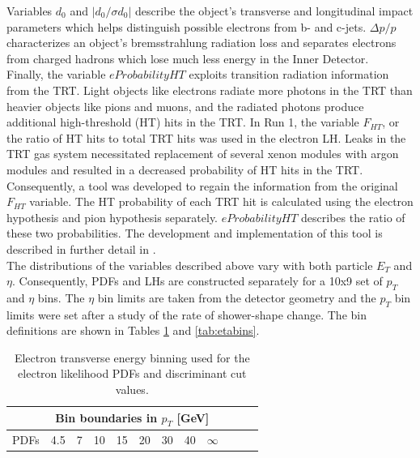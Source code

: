 Variables $d_0$ and $|d_0/\sigma d_0|$ describe the object's transverse and longitudinal impact parameters which helps distinguish possible electrons from b- and c-jets. $\Delta p /p$ characterizes an object's bremsstrahlung radiation loss and separates electrons from charged hadrons which lose much less energy in the Inner Detector. \\

Finally, the variable $eProbabilityHT$ exploits transition radiation information from the TRT. Light objects like electrons radiate more photons in the TRT than heavier objects like pions and muons, and the radiated photons produce additional high-threshold (HT) hits in the TRT. In Run 1, the variable $F_{HT}$, or the ratio of HT hits to total TRT hits was used in the electron LH. Leaks in the TRT gas system necessitated replacement of several xenon modules with argon modules and resulted in a decreased probability of HT hits in the TRT. Consequently, a tool was developed to regain the information from the original $F_{HT}$ variable. The HT probability of each TRT hit is calculated using the electron hypothesis and pion hypothesis separately. $eProbabilityHT$ describes the ratio of these two probabilities. The development and implementation of this tool is described in further detail in \cite{2015_eff_paper}. \\


The distributions of the variables described above vary with both particle $E_T$ and $\eta$. Consequently, PDFs and LHs are constructed separately for a 10x9 set of $p_T$ and $\eta$ bins. The $\eta$ bin limits are taken from the detector geometry and the $p_T$ bin limits were set after a study of the rate of shower-shape change. The bin definitions are shown in Tables \ref{tab:etbins} and \ref{tab:etabins}.\\

\begin{table}[!htbp]
	\begin{center}
	\begin{tabular}{l|ccccccccccc}
	\hline
	\multicolumn{12}{c}{Bin boundaries in $p_T$ [GeV]}\\
	\hline
	PDFs                    & 4.5& 7& 10& 15& 20& 30& 40& $\infty$&  &   & \\
	\hline
	\end{tabular}
	\end{center}
	  \caption{Electron transverse energy binning used for the electron likelihood PDFs and discriminant cut values.}
	\label{tab:etbins}	
\end{table}

